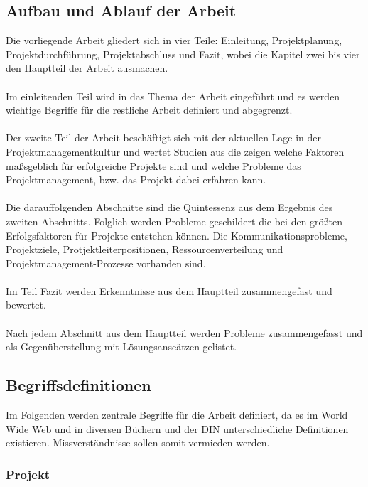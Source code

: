 \documentclass[12pt]{scrartcl}
\begin{document}
\subsection{Aufbau und Ablauf der Arbeit}
Die vorliegende Arbeit gliedert sich in vier Teile: Einleitung, Projektplanung, Projektdurchführung, Projektabschluss und Fazit, wobei die Kapitel zwei bis vier den Hauptteil der Arbeit ausmachen. 
\\ \\
Im einleitenden Teil wird in das Thema der Arbeit eingeführt und es werden wichtige Begriffe für die restliche Arbeit definiert und abgegrenzt.  
\\ \\
Der zweite Teil der Arbeit beschäftigt sich mit der aktuellen Lage in der Projektmanagementkultur und wertet Studien aus die zeigen welche Faktoren maßsgeblich für erfolgreiche Projekte sind und welche Probleme das Projektmanagement, bzw. das Projekt dabei erfahren kann. 
\\ \\
Die darauffolgenden Abschnitte sind die Quintessenz aus dem Ergebnis des zweiten Abschnitts. Folglich werden Probleme geschildert die bei den größten Erfolgsfaktoren für Projekte entstehen können. Die Kommunikationsprobleme, Projektziele, Protjektleiterpositionen, Ressourcenverteilung und Projektmanagement-Prozesse vorhanden sind. 
\\ \\
Im Teil Fazit werden Erkenntnisse aus dem Hauptteil zusammengefast und bewertet.
\\ \\
Nach jedem Abschnitt aus dem Hauptteil werden Probleme zusammengefasst und als Gegenüberstellung mit Lösungsanseätzen gelistet. 
\subsection{Begriffsdefinitionen}

Im Folgenden werden zentrale Begriffe für die Arbeit definiert, da es im World Wide Web und in diversen Büchern und der DIN unterschiedliche Definitionen existieren. Missverständnisse sollen somit vermieden werden.

\subsubsection{Projekt}
\end{document}
